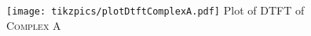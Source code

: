 \documentclass[../../course]{subfiles}
\begin{document}
\begin{figure}
    \centering
     {
        \texttt{[image: tikzpics/plotDtftComplexA.pdf]}
    }
     {Plot of \textsc{DTFT} of \textsc{Complex A}}
    \label{plt:dtftComplexA}
\end{figure}




%
%
%
%
%
%
%
\end{document}
